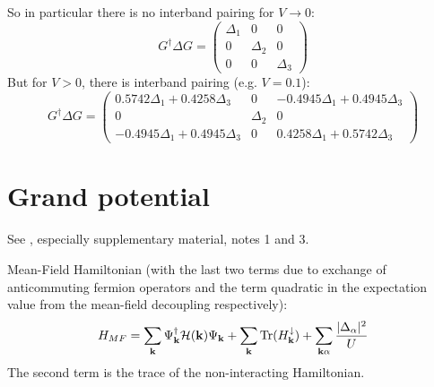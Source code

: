 \documentclass[../main.tex]{subfiles}
\begin{document}
So in particular there is no interband pairing for \(V \to 0\):
\begin{equation}
    G^{\dagger} \Delta G =
    \begin{pmatrix}
        \Delta_1 & 0 & 0 \\
        0 & \Delta_{2} & 0 \\
        0 & 0 & \Delta_3
    \end{pmatrix}
\end{equation}
But for \(V > 0\), there is interband pairing (e.g. \(V = 0.1\)):
\begin{equation}
    G^{\dagger} \Delta G =
    \begin{pmatrix}
        0.5742 \Delta_{1} + 0.4258 \Delta_{3} & 0 & - 0.4945 \Delta_{1} + 0.4945 \Delta_{3} \\
        0 & \Delta_{2} & 0 \\
        - 0.4945 \Delta_{1} + 0.4945 \Delta_{3} & 0 & 0.4258 \Delta_{1} + 0.5742 \Delta_{3}
    \end{pmatrix}
\end{equation}

\section{Grand potential}

See \cite{peottaSuperfluidityTopologicallyNontrivial2015}, especially supplementary material, notes 1 and 3.

Mean-Field Hamiltonian (with the last two terms due to exchange of anticommuting fermion operators and the term quadratic in the expectation value from the mean-field decoupling respectively):
\begin{equation}
	H_{MF} = \sum_{\bm{\mathrm{k}}} \Psi_{\bm{\mathrm{k}}}^{\dagger} \mathcal{H} (\bm{\mathrm{k}}) \Psi_{\bm{\mathrm{k}}} + \sum_{\bm{\mathrm{k}}} \operatorname{Tr}(H^{\downarrow}_{\bm{\mathrm{k}}}) + \sum_{\bm{\mathrm{k}} \alpha} \frac{\vert \Delta_{\alpha} \vert^2}{U}
\end{equation}
The second term is the trace of the non-interacting Hamiltonian.
\end{document}
